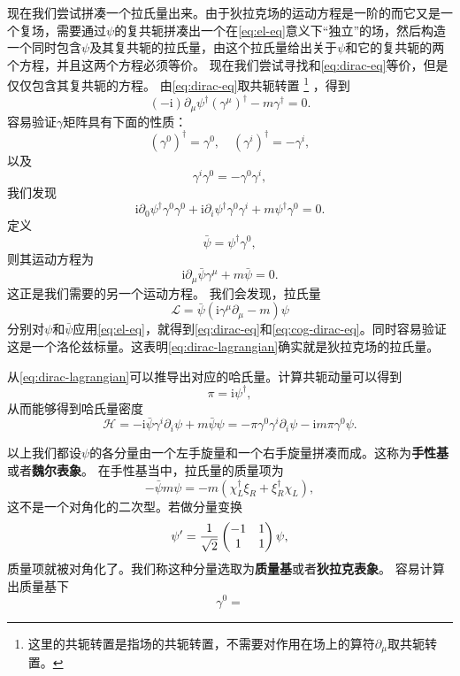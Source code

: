 \documentclass[hyperref, UTF8, a4paper]{ctexart}
\newcommand*{\ii}{\mathrm{i}}
\begin{document}
现在我们尝试拼凑一个拉氏量出来。由于狄拉克场的运动方程是一阶的而它又是一个复场，需要通过$\psi$的复共轭拼凑出一个在\eqref{eq:el-eq}意义下“独立”的场，然后构造一个同时包含$\psi$及其复共轭的拉氏量，由这个拉氏量给出关于$\psi$和它的复共轭的两个方程，并且这两个方程必须等价。
现在我们尝试寻找和\eqref{eq:dirac-eq}等价，但是仅仅包含其复共轭的方程。
由\eqref{eq:dirac-eq}取共轭转置%
\footnote{这里的共轭转置是指场的共轭转置，不需要对作用在场上的算符$\partial_\mu$取共轭转置。}
，得到
\[
    (-\ii) \partial_\mu \psi^\dagger (\gamma^\mu)^\dagger - m \gamma^\dagger = 0.
\]
容易验证$\gamma$矩阵具有下面的性质：
\[
    (\gamma^0)^\dagger = \gamma^0, \quad (\gamma^i)^\dagger = - \gamma^i, 
\]
以及
\[
    \gamma^i \gamma^0 = - \gamma^0 \gamma^i,
\]
我们发现
\[
    \ii \partial_0 \psi^\dagger \gamma^0 \gamma^0 + \ii \partial_i \psi^\dagger \gamma^0 \gamma^i + m \psi^\dagger \gamma^0 = 0.
\]
定义
\begin{equation}
    \bar{\psi} = \psi^\dagger \gamma^0,
\end{equation}
则其运动方程为
\begin{equation}
    \ii \partial_\mu \bar{\psi} \gamma^\mu + m \bar{\psi} = 0.
    \label{eq:cog-dirac-eq}
\end{equation}
这正是我们需要的另一个运动方程。
我们会发现，拉氏量
\begin{equation}
    \mathcal{L} = \bar{\psi} (\ii \gamma^\mu \partial_\mu - m) \psi
    \label{eq:dirac-lagrangian}
\end{equation}
分别对$\psi$和$\bar{\psi}$应用\eqref{eq:el-eq}，就得到\eqref{eq:dirac-eq}和\eqref{eq:cog-dirac-eq}。同时容易验证这是一个洛伦兹标量。这表明\eqref{eq:dirac-lagrangian}确实就是狄拉克场的拉氏量。

从\eqref{eq:dirac-lagrangian}可以推导出对应的哈氏量。计算共轭动量可以得到
\begin{equation}
    \pi = \ii \psi^\dagger,
\end{equation}
从而能够得到哈氏量密度
\begin{equation}
    \mathcal{H} = - \ii \bar{\psi} \gamma^i \partial_i \psi  + m \bar{\psi} \psi = - \pi \gamma^0 \gamma^i \partial_i \psi - \ii m \pi \gamma^0 \psi.
\end{equation}

以上我们都设$\psi$的各分量由一个左手旋量和一个右手旋量拼凑而成。这称为\textbf{手性基}或者\textbf{魏尔表象}。
在手性基当中，拉氏量的质量项为
\[
    - \bar{\psi} m \psi = - m (\chi_L^\dagger \xi_R + \xi_R^\dagger \chi_L),
\]
这不是一个对角化的二次型。若做分量变换
\begin{equation}
    \psi' = \frac{1}{\sqrt{2}} \pmqty{-1 & 1 \\ 1 & 1} \psi,
\end{equation}
质量项就被对角化了。我们称这种分量选取为\textbf{质量基}或者\textbf{狄拉克表象}。
容易计算出质量基下
\begin{equation}
    \gamma^0 = 
\end{equation}
\end{document}
